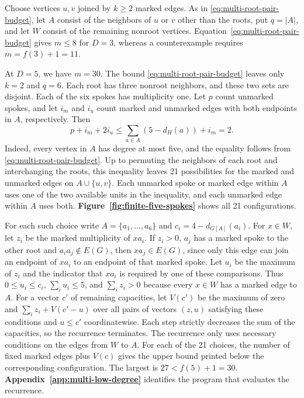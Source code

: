 Choose vertices $u,v$ joined by $k\geq2$ marked edges. As in
\eqref{eq:multi-root-pair-budget}, let $A$ consist of the neighbors of
$u$ or $v$ other than the roots, put $q=|A|$, and let $W$ consist of
the remaining nonroot vertices. Equation~\eqref{eq:multi-root-pair-budget} gives
$m\leq8$ for $D=3$, whereas a counterexample requires $m=f(3)+1=11$.

At $D=5$, we have $m=30$. The bound
\eqref{eq:multi-root-pair-budget} leaves only $k=2$ and $q=6$.
Each root has three nonroot neighbors, and these two sets are
disjoint. Each of the six spokes has multiplicity one. Let $p$
count unmarked spokes, and let $i_m$ and $i_u$ count marked and
unmarked edges with both endpoints in $A$, respectively. Then
\[
 p+i_m+2i_u\le\sum_{a\in A}(5-d_H(a))+i_m=2.
\]
Indeed, every vertex in $A$ has degree at most five, and
the equality follows from \eqref{eq:multi-root-pair-budget}.
Up to permuting the neighbors of each root and interchanging the
roots, this inequality leaves 21 possibilities for the marked and
unmarked edges on $A\cup\{u,v\}$. Each unmarked spoke or marked edge
within $A$ uses one of the two available units in the inequality,
and each unmarked edge within $A$ uses both.
\textbf{Figure~\ref{fig:finite-five-spokes}} shows all 21 configurations.

For each such choice write $A=\{a_1,\ldots,a_6\}$ and
$c_i=4-d_{G[A]}(a_i)$. For $x\in W$, let $z_i$ be the
marked multiplicity of $xa_i$. If $z_i>0$, $a_j$ has a
marked spoke to the other root and $a_ia_j\notin E(G)$,
then $xa_j\in E(G)$, since only this edge can join an endpoint
of $xa_i$ to an endpoint of that marked spoke. Let $u_i$ be the maximum of $z_i$ and the
indicator that $xa_i$ is required by one of these comparisons.
Thus $0\le u_i\le c_i$, $\sum_i u_i\le5$, and
$\sum_i z_i>0$ because every $x\in W$ has a marked edge to $A$.
For a vector $c'$ of remaining capacities, let $V(c')$ be
the maximum of zero and $\sum_i z_i+V(c'-u)$ over all
pairs of vectors $(z,u)$ satisfying these conditions and $u\le c'$
coordinatewise. Each step strictly decreases the sum of
the capacities, so the recurrence terminates. The recurrence
only uses necessary conditions on the edges from $W$ to $A$.
For each of the 21 choices, the number of fixed marked edges plus
$V(c)$ gives the upper bound printed below the corresponding
configuration. The largest is $27< f(5)+1=30$.
\textbf{Appendix~\ref{app:multi-low-degree}} identifies the program
that evaluates the recurrence.


\FloatBarrier


